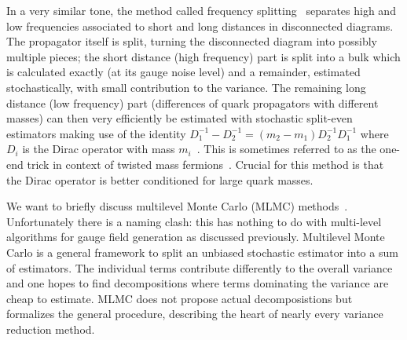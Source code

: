 In a very similar tone, the method called frequency splitting~\cite{Giusti:2019kff,Giusti:2020dtz} separates high and low frequencies associated to short and long distances in disconnected diagrams.
The propagator itself is split, turning the disconnected diagram into possibly multiple pieces; the short distance (high frequency) part is split into a bulk which is calculated exactly (\ie at its gauge noise level) and a remainder, estimated stochastically, with small contribution to the variance.
The remaining long distance (low frequency) part (differences of quark propagators with different masses) can then very efficiently be estimated with stochastic split-even estimators making use of the identity $D_1^{-1} - D_2^{-1} = (m_2 - m_1) D_2^{-1} D_1^{-1}$ where $D_i$ is the Dirac operator with mass $m_i$~\cite{Whyte:2022vrk}.
This is sometimes referred to as the one-end trick in context of twisted mass fermions~\cite{ETM:2008zte,PhysRevD.73.074506,PhysRevD.59.074503}.
Crucial for this method is that the Dirac operator is better conditioned for large quark masses.


We want to briefly discuss multilevel Monte Carlo (MLMC) methods~\cite{giles2008,Giles_2015}.
Unfortunately there is a naming clash: this has nothing to do with multi-level algorithms for gauge field generation as discussed previously.
Multilevel Monte Carlo is a general framework to split an unbiased stochastic estimator into a sum of estimators.
The individual terms contribute differently to the overall variance and one hopes to find decompositions where terms dominating the variance are cheap to estimate.
MLMC does not propose actual decomposistions but formalizes the general procedure, describing the heart of nearly every variance reduction method.

